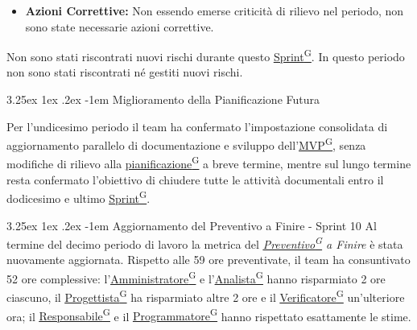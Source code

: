 \documentclass[a4paper,12pt]{article}
\makeatletter
\renewcommand\paragraph{\@startsection{paragraph}{5}{\z@}%
  {3.25ex \@plus1ex \@minus.2ex}%
  {-1em}%
  {\normalfont\normalsize\bfseries}}
\providecommand{\glslink}[2]{\href{https://alittlebyte-19.github.io/Documentazione/glossario.html\#gls-#1}{\underline{#2}\textsuperscript{\scriptsize G}}}
\makeatother
\begin{document}
\begin{itemize}
    \item \textbf{Azioni Correttive:} Non essendo emerse criticità di rilievo nel periodo, non sono state necessarie azioni correttive.
\end{itemize}
Non sono stati riscontrati nuovi rischi durante questo \glslink{sprint}{Sprint}.
In questo periodo non sono stati riscontrati né gestiti nuovi rischi.


\paragraph{Miglioramento della Pianificazione Futura}

Per l'undicesimo periodo il team ha confermato l'impostazione consolidata di aggiornamento parallelo di documentazione e sviluppo dell'\glslink{mvp-minimum-viable-product}{MVP}, senza modifiche di rilievo alla \glslink{pianificazione}{pianificazione} a breve termine, mentre sul lungo termine resta confermato l'obiettivo di chiudere tutte le attività documentali entro il dodicesimo e ultimo \glslink{sprint}{Sprint}.


\paragraph{Aggiornamento del Preventivo a Finire - Sprint 10}
Al termine del decimo periodo di lavoro la metrica del \textit{\glslink{preventivo}{Preventivo} a Finire} è stata nuovamente aggiornata. Rispetto alle 59 ore preventivate, il team ha consuntivato 52 ore complessive: l'\glslink{amministratore}{Amministratore} e l'\glslink{analista}{Analista} hanno risparmiato 2 ore ciascuno, il \glslink{progettista}{Progettista} ha risparmiato altre 2 ore e il \glslink{verificatore}{Verificatore} un'ulteriore ora; il \glslink{responsabile}{Responsabile} e il \glslink{programmatore}{Programmatore} hanno rispettato esattamente le stime.
\end{document}

